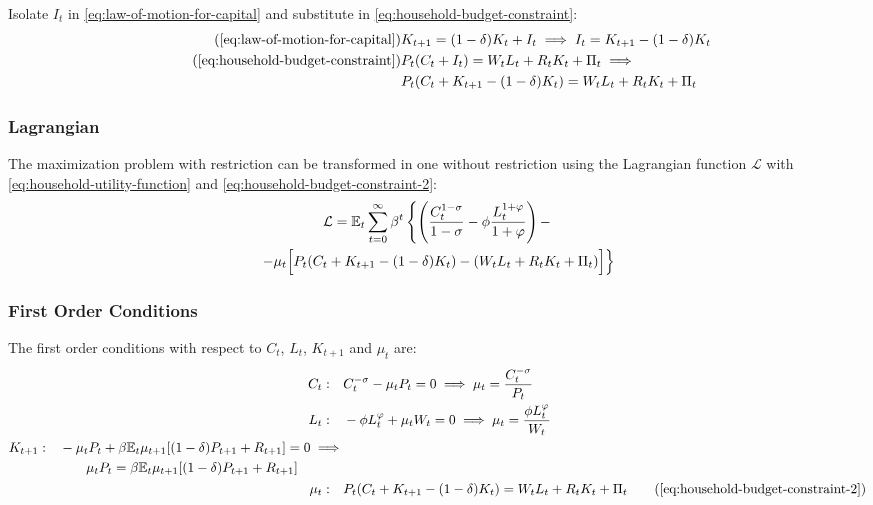\documentclass[
	12pt, 
	]{article}
\numberwithin{equation}{section}
\theoremstyle{definition}
\theoremstyle{plain}
\theoremstyle{plain}
\theoremstyle{plain}
\begin{document}
Isolate $I_t$ in \ref{eq:law-of-motion-for-capital} and substitute in \ref{eq:household-budget-constraint}:
\begin{align}
\tag{\ref{eq:law-of-motion-for-capital}}
	& K_{t+1} = (1-\delta)K_t + I_t \implies I_t = K_{t+1} - (1-\delta)K_t \\
\tag{\ref{eq:household-budget-constraint}}
	& P_t (C_t + I_t) = W_t L_t + R_t K_t + \Pi_t \implies \\
\label{eq:household-budget-constraint-2}
	& P_t (C_t + K_{t+1} - (1-\delta)K_t) = W_t L_t + R_t K_t + \Pi_t
\end{align}

\subsubsection*{Lagrangian}

The maximization problem with restriction can be transformed in one without restriction using the Lagrangian function $\mathcal{L}$ with \ref{eq:household-utility-function} and \ref{eq:household-budget-constraint-2}:
\begin{multline}
\label{eq:household-lagrangian}
	\mathcal{L} = \mathbb{E}_t \sum_{t=0}^{\infty} \beta^t 
	\left\{ \left( \frac{C_t^{1-\sigma}}{1-\sigma} - \phi \frac{L_t^{1+\varphi}}{1+\varphi} \right) - \right.
\\
	\left. -\mu_t \Bigr[ P_t (C_t + K_{t+1} - (1-\delta) K_t) - (W_t L_t + R_t K_t + \Pi_t) \Bigl] \right\}
\end{multline}

\subsubsection*{First Order Conditions}

The first order conditions with respect to $C_t$, $L_t$, $K_{t+1}$ and $\mu_t$ are:
\begin{align}
	C_t: \quad & C_t^{-\sigma} -\mu_t P_t = 0 \implies \mu_t = \frac{C_t^{-\sigma}}{P_t} \label{eq:household-FOC-Ct} \\
	L_t: \quad & -\phi L_t^{\varphi} +\mu_t W_t = 0 \implies \mu_t = \frac{\phi L_t^{\varphi}}{W_t} \label{eq:household-FOC-Lt} \\
	\begin{split}
		K_{t+1}: \quad & -\mu_t P_t +\beta \mathbb{E}_t \mu_{t+1} [(1-\delta) P_{t+1} + R_{t+1}] = 0 \implies \\ & \qquad \mu_t P_t = \beta \mathbb{E}_t \mu_{t+1} [(1-\delta) P_{t+1} + R_{t+1}]
	\end{split} \label{eq:household-FOC-Kt} \\
	\mu_t: \quad & P_t (C_t + K_{t+1} - (1-\delta)K_t) = W_t L_t + R_t K_t + \Pi_t \tag{\ref{eq:household-budget-constraint-2}}
\end{align}
\end{document}

